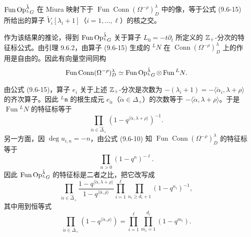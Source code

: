 \begin{proposition}
    $\operatorname{Fun}\operatorname{Op}^{\check\lambda}_{{}^LG}$ 在 Miura 映射下于 $\operatorname{Fun}\operatorname{Conn}(\Omega^{-\rho})^\lambda_D$ 中的像，等于公式 (9.6-15) 所给出的算子 $\widetilde{V}_i[\lambda_i+1]$（$i=1,\dots,\ell$）的核之交。
\end{proposition}

作为该结果的推论，得到 $\operatorname{Fun}\operatorname{Op}^{\check\lambda}_{{}^LG}$ 关于算子 $L_0=-t\partial_t$ 所定义的 $\mathbb{Z}_+$-分次的特征标公式。由引理 9.6.2，由算子 (9.6-15) 生成的 ${}^LN$ 在 $\operatorname{Conn}(\Omega^{-\rho})^\lambda_D$ 上的作用是自由的。因此有向量空间同构
\[
    \operatorname{Fun}\operatorname{Conn}(\Omega^{-\rho})^\lambda_D
    \simeq\operatorname{Fun}\operatorname{Op}^{\check\lambda}_{{}^LG}\otimes\operatorname{Fun}{}^LN .
\]

由公式 (9.6-15)，算子 $e_i$ 关于上述 $\mathbb{Z}_+$-分次是次数为 $-(\lambda_i+1)=-\langle\check\alpha_i,\lambda+\rho\rangle$ 的齐次算子。因此 ${}^L\mathfrak{n}$ 的根生成元 $e_{\check\alpha}$（$\check\alpha\in\Delta_+$）的次数等于 $-\langle\check\alpha,\lambda+\rho\rangle$。于是 $\operatorname{Fun}{}^LN$ 的特征标等于
\[
    \prod_{\check\alpha\in\hat\Delta_+}\left(1-q^{\langle\check\alpha,\lambda+\rho\rangle}\right)^{-1}.
\]
另一方面，因 $\deg u_{i,n}=-n$，由公式 (9.6-10) 知 $\operatorname{Fun}\operatorname{Conn}(\Omega^{-\rho})^\lambda_D$ 的特征标等于
\[
    \prod_{n>0}(1-q^n)^{-\ell}.
\]
因此 $\operatorname{Fun}\operatorname{Op}^{\check\lambda}_{{}^LG}$ 的特征标是二者之比，把它改写成
\begin{equation}
    \prod_{\check\alpha\in\hat\Delta_+}\frac{1-q^{\langle\check\alpha,\lambda+\rho\rangle}}{1-q^{\langle\check\alpha,\rho\rangle}}
    \prod_{i=1}^{\ell}\prod_{n_i\ge d_i+1}(1-q^{n_i})^{-1},
    \tag{9.6-16}
\end{equation}
其中用到恒等式
\[
    \prod_{\check\alpha\in\Delta_+}\left(1-q^{\langle\check\alpha,\rho\rangle}\right)
    =\prod_{i=1}^{\ell}\prod_{m_i=1}^{d_i}(1-q^{m_i}).
\]


